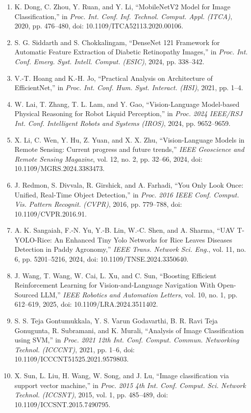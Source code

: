 \documentclass[12pt,a4paper]{report}
\begin{document}
\begin{enumerate}
	\item K. Dong, C. Zhou, Y. Ruan, and Y. Li, ``MobileNetV2 Model for Image Classification,'' in \textit{Proc. Int. Conf. Inf. Technol. Comput. Appl. (ITCA)}, 2020, pp. 476--480, doi: 10.1109/ITCA52113.2020.00106.
	\item S. G. Siddarth and S. Chokkalingam, ``DenseNet 121 Framework for Automatic Feature Extraction of Diabetic Retinopathy Images,'' in \textit{Proc. Int. Conf. Emerg. Syst. Intell. Comput. (ESIC)}, 2024, pp. 338--342.
	 \item V.-T. Hoang and K.-H. Jo, ``Practical Analysis on Architecture of EfficientNet,'' in \textit{Proc. Int. Conf. Hum. Syst. Interact. (HSI)}, 2021, pp. 1--4.
	\item W. Lai, T. Zhang, T. L. Lam, and Y. Gao, ``Vision-Language Model-based Physical Reasoning for Robot Liquid Perception,'' in \textit{Proc. 2024 IEEE/RSJ Int. Conf. Intelligent Robots and Systems (IROS)}, 2024, pp. 9652--9659.
	\item X. Li, C. Wen, Y. Hu, Z. Yuan, and X. X. Zhu, ``Vision-Language Models in Remote Sensing: Current progress and future trends,'' \textit{IEEE Geoscience and Remote Sensing Magazine}, vol. 12, no. 2, pp. 32--66, 2024, doi: 10.1109/MGRS.2024.3383473.
	\item J. Redmon, S. Divvala, R. Girshick, and A. Farhadi, ``You Only Look Once: Unified, Real-Time Object Detection,'' in \textit{Proc. 2016 IEEE Conf. Comput. Vis. Pattern Recognit. (CVPR)}, 2016, pp. 779--788, doi: 10.1109/CVPR.2016.91.
	\item A. K. Sangaiah, F.-N. Yu, Y.-B. Lin, W.-C. Shen, and A. Sharma, ``UAV T-YOLO-Rice: An Enhanced Tiny Yolo Networks for Rice Leaves Diseases Detection in Paddy Agronomy,'' \textit{IEEE Trans. Network Sci. Eng.}, vol. 11, no. 6, pp. 5201--5216, 2024, doi: 10.1109/TNSE.2024.3350640.
	\item J. Wang, T. Wang, W. Cai, L. Xu, and C. Sun, ``Boosting Efficient Reinforcement Learning for Vision-and-Language Navigation With Open-Sourced LLM,'' \textit{IEEE Robotics and Automation Letters}, vol. 10, no. 1, pp. 612--619, 2025, doi: 10.1109/LRA.2024.3511402.
	\item S. S. Teja Gontumukkala, Y. S. Varun Godavarthi, B. R. Ravi Teja Gonugunta, R. Subramani, and K. Murali, ``Analysis of Image Classification using SVM,'' in \textit{Proc. 2021 12th Int. Conf. Comput. Commun. Networking Technol. (ICCCNT)}, 2021, pp. 1--6, doi: 10.1109/ICCCNT51525.2021.9579803.
	\item X. Sun, L. Liu, H. Wang, W. Song, and J. Lu, ``Image classification via support vector machine,'' in \textit{Proc. 2015 4th Int. Conf. Comput. Sci. Network Technol. (ICCSNT)}, 2015, vol. 1, pp. 485--489, doi: 10.1109/ICCSNT.2015.7490795.

\end{enumerate}
\end{document}
